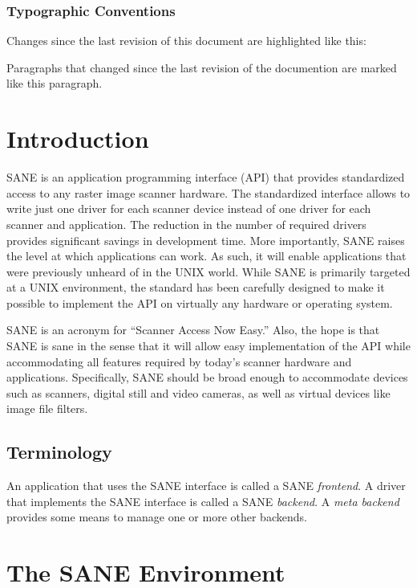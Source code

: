 \documentclass[11pt,DVIps]{report}
\begin{document}
\subsection{Typographic Conventions}

Changes since the last revision of this document are highlighted
like this:

\begin{changebar}
   Paragraphs that changed since the last revision of the documention
   are marked like this paragraph.
\end{changebar}

\chapter{Introduction}\label{chap:intro}

SANE is an application programming interface (API) that provides
standardized access to any raster image scanner hardware.  The
standardized interface allows to write just one driver for each
scanner device instead of one driver for each scanner and application.
The reduction in the number of required drivers provides significant
savings in development time.  More importantly, SANE raises the level
at which applications can work.  As such, it will enable applications
that were previously unheard of in the UNIX world.  While SANE is
primarily targeted at a UNIX environment, the standard has been
carefully designed to make it possible to implement the API on
virtually any hardware or operating system.

SANE is an acronym for ``Scanner Access Now Easy.''  Also, the hope is
that SANE is sane in the sense that it will allow easy implementation
of the API while accommodating all features required by today's
scanner hardware and applications.  Specifically, SANE should be broad
enough to accommodate devices such as scanners, digital still and
video cameras, as well as virtual devices like image file filters.

\section{Terminology}

An application that uses the SANE interface is called a SANE {\em
  frontend}.  A driver that implements the SANE interface is called a
SANE {\em backend}.  A {\em meta backend\/} provides some means to
manage one or more other backends.


\chapter{The SANE Environment}\label{chap:environ}
\end{document}
